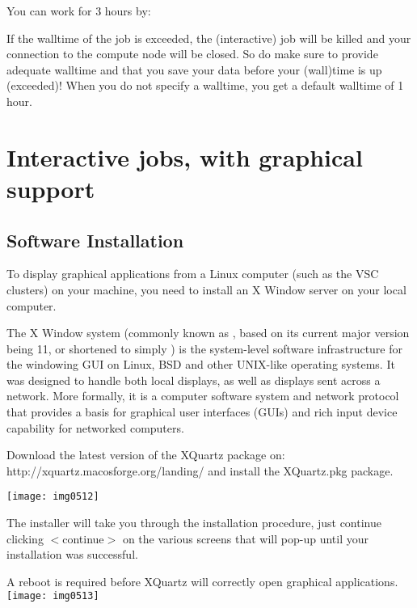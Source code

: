 You can work for 3 hours by:
\begin{prompt}
\end{prompt}

If the walltime of the job is exceeded, the (interactive) job will be killed
and your connection to the compute node will be closed. So do make sure to
provide adequate walltime and that you save your data before your (wall)time is
up (exceeded)!  When you do not specify a walltime, you get a default walltime
of 1 hour.

\section{Interactive jobs, with graphical support}

\subsection{Software Installation}

To display graphical applications from a Linux computer (such as the VSC
clusters) on your machine, you need to install an X Window server on your
local computer.

The X Window system (commonly known as , based on its current major
version being 11, or shortened to simply ) is the system-level
software infrastructure for the windowing GUI on Linux, BSD and other UNIX-like
operating systems. It was designed to handle both local displays, as well as
displays sent across a network. More formally, it is a computer software system
and network protocol that provides a basis for graphical user interfaces (GUIs)
and rich input device capability for networked computers.

\ifmac
  Download the latest version of the XQuartz package on:
  http://xquartz.macosforge.org/landing/
  and install the XQuartz.pkg package.

  \texttt{[image: img0512]}

  The installer will take you through the installation procedure, just continue
  clicking $<$continue$>$ on the various screens that will pop-up until your
  installation was successful.

  A reboot is required before XQuartz will correctly open graphical applications.
  \texttt{[image: img0513]}
\fi
\iflinux
\fi

